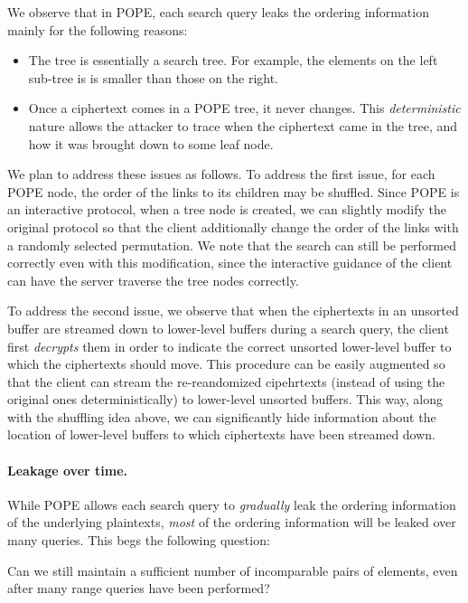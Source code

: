 We observe that in POPE, each search query leaks the ordering information
mainly for the following reasons: 

\begin{itemize}
\item The tree is essentially a search tree. For example, the elements on the
  left sub-tree is is smaller than those on the right.
 
\item Once a ciphertext comes in a POPE tree, it never changes. This {\em
  deterministic} nature allows the attacker to trace when the ciphertext came
  in the tree, and how it was brought down to some leaf node.  
\end{itemize}

We plan to address these issues as follows. To address the first issue, for
each POPE node, the order of the links to its children may be shuffled. Since
POPE is an interactive protocol, when a tree node is created, we can slightly
modify the original protocol so that the client additionally change the order
of the links with a randomly selected permutation. 
%
We note that the search can still be performed correctly even with this
modification, since the interactive guidance of the client can have the server
traverse the tree nodes correctly. 
    
To address the second issue, we observe that when the ciphertexts in an
unsorted buffer are streamed down to lower-level buffers during a search query,
the client first {\em decrypts} them in order to indicate the correct unsorted
lower-level buffer to which the ciphertexts should move. This procedure can be
easily augmented so that the client can stream the {re-reandomized cipehrtexts}
(instead of using the original ones deterministically) to lower-level unsorted
buffers. This way, along with the shuffling idea above, we can significantly
hide information about the location of lower-level buffers to which ciphertexts
have been streamed down. 

\paragraph{Leakage over time.}
While POPE allows each search query to {\it gradually} leak the ordering
information of the underlying plaintexts, {\em most} of the ordering
information will be leaked over many queries. This begs the following question: 

\begin{question}
Can we still maintain a sufficient number of incomparable pairs of elements, even after
  many range queries have been performed?  
\end{question}

